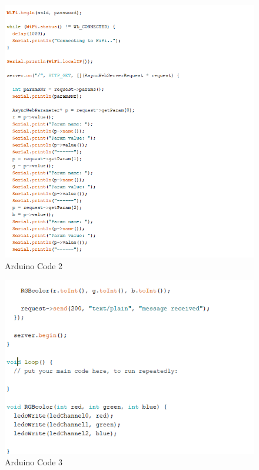\begin{figure}[h]
\begin{center}
\includegraphics[width=15cm]{img/arduinocode2.png}
\caption{Arduino Code 2}
\label{arduinocode2}
\end{center}
\end{figure}

\begin{figure}[h]
\begin{center}
\includegraphics[width=15cm]{img/arduinocode3.png}
\caption{Arduino Code 3}
\label{arduinocode3}
\end{center}
\end{figure}

